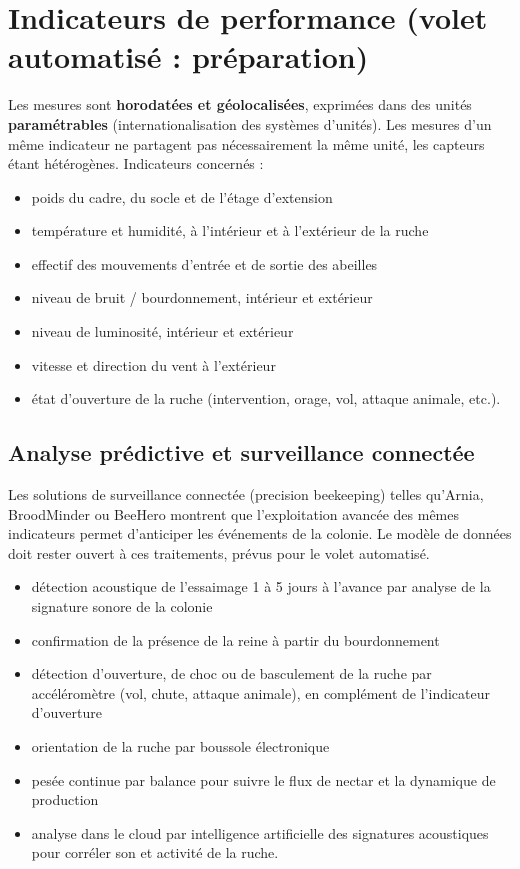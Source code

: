 \section{Indicateurs de performance (volet automatisé : préparation)}
Les mesures sont \textbf{horodatées et géolocalisées}, exprimées dans des unités
\textbf{paramétrables} (internationalisation des systèmes d'unités). Les mesures
d'un même indicateur ne partagent pas nécessairement la même unité, les capteurs
étant hétérogènes. Indicateurs concernés :
\begin{itemize}
  \item poids du cadre, du socle et de l'étage d'extension
  \item température et humidité, à l'intérieur et à l'extérieur de la ruche
  \item effectif des mouvements d'entrée et de sortie des abeilles
  \item niveau de bruit / bourdonnement, intérieur et extérieur
  \item niveau de luminosité, intérieur et extérieur
  \item vitesse et direction du vent à l'extérieur
  \item état d'ouverture de la ruche (intervention, orage, vol, attaque animale, etc.).
\end{itemize}

\subsection{Analyse prédictive et surveillance connectée}
Les solutions de surveillance connectée (precision beekeeping) telles qu'Arnia,
BroodMinder ou BeeHero montrent que l'exploitation avancée des mêmes indicateurs
permet d'anticiper les événements de la colonie. Le modèle de données doit rester
ouvert à ces traitements, prévus pour le volet automatisé.
\begin{itemize}
  \item détection acoustique de l'essaimage 1 à 5 jours à l'avance par analyse de la signature sonore de la colonie
  \item confirmation de la présence de la reine à partir du bourdonnement
  \item détection d'ouverture, de choc ou de basculement de la ruche par accéléromètre (vol, chute, attaque animale), en complément de l'indicateur d'ouverture
  \item orientation de la ruche par boussole électronique
  \item pesée continue par balance pour suivre le flux de nectar et la dynamique de production
  \item analyse dans le cloud par intelligence artificielle des signatures acoustiques pour corréler son et activité de la ruche.
\end{itemize}

